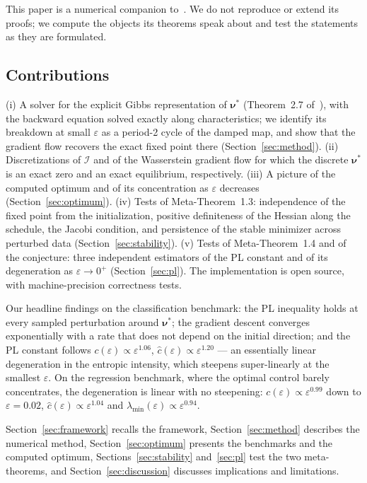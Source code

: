 \documentclass[11pt,leqno]{amsart}
\newcommand{\cI}{\mathcal{I}}
\newcommand{\bnu}{\boldsymbol{\nu}}
\newcommand{\eps}{\varepsilon}
\numberwithin{equation}{section}
\theoremstyle{definition}
\begin{document}
This paper is a numerical companion to~\cite{DaudinDelarue2025}.  We do not
reproduce or extend its proofs; we compute the objects its theorems speak
about and test the statements as they are formulated.

\subsection*{Contributions}
(i) A solver for the explicit Gibbs representation of $\bnu^*$
(Theorem~2.7 of~\cite{DaudinDelarue2025}), with the backward equation
solved exactly along characteristics; we identify its breakdown at small
$\eps$ as a period-2 cycle of the damped map, and show that the gradient
flow recovers the exact fixed point there (Section~\ref{sec:method}).
(ii) Discretizations of $\cI$ and of the Wasserstein gradient flow for
which the discrete $\bnu^*$ is an exact zero and an exact equilibrium,
respectively.  (iii) A picture of the computed optimum and of its
concentration as $\eps$ decreases (Section~\ref{sec:optimum}).
(iv) Tests of Meta-Theorem~1.3: independence of the fixed point from the
initialization, positive definiteness of the Hessian along the schedule,
the Jacobi condition, and persistence of the stable minimizer across
perturbed data (Section~\ref{sec:stability}).  (v) Tests of Meta-Theorem~1.4 and of the
conjecture: three independent estimators of the PL constant and of its
degeneration as $\eps\to0^+$ (Section~\ref{sec:pl}).  The implementation
is open source, with machine-precision correctness tests.

Our headline findings on the classification benchmark: the PL inequality
holds at every sampled perturbation around $\bnu^*$; the gradient descent
converges exponentially with a rate that does not depend on the initial
direction; and
the PL constant follows $c(\eps)\propto\eps^{1.06}$,
$\hat c(\eps)\propto\eps^{1.20}$ --- an essentially linear degeneration in
the entropic intensity, which steepens super-linearly at the smallest $\eps$.
On the regression benchmark, where the optimal control barely
concentrates, the degeneration is linear with no steepening:
$c(\eps)\propto\eps^{0.99}$ down to $\eps=0.02$,
$\hat c(\eps)\propto\eps^{1.04}$ and $\lambda_{\min}(\eps)\propto\eps^{0.94}$.

Section~\ref{sec:framework} recalls the framework,
Section~\ref{sec:method} describes the numerical method,
Section~\ref{sec:optimum} presents the benchmarks and the computed optimum,
Sections~\ref{sec:stability} and~\ref{sec:pl} test the two meta-theorems,
and Section~\ref{sec:discussion} discusses implications and limitations.
\end{document}
